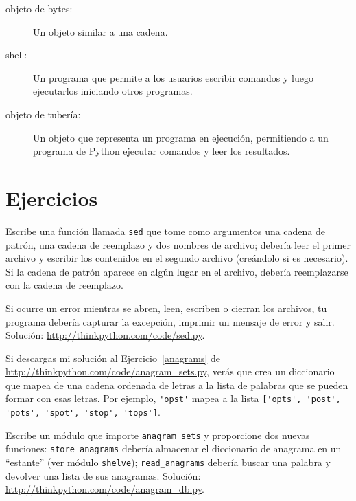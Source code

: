 \documentclass[10pt]{book}
\begin{document}
\begin{description}
\item[objeto de bytes:] Un objeto similar a una cadena.

\item[shell:] Un programa que permite a los usuarios escribir comandos y luego
ejecutarlos iniciando otros programas.

\item[objeto de tubería:] Un objeto que representa un programa en ejecución, permitiendo
a un programa de Python ejecutar comandos y leer los resultados.

\end{description}


\section{Ejercicios}

\begin{exercise}

Escribe una función llamada {\tt sed} que tome como argumentos una cadena de patrón,
una cadena de reemplazo y dos nombres de archivo; debería leer el primer archivo
y escribir los contenidos en el segundo archivo (creándolo si es
necesario).  Si la cadena de patrón aparece en algún lugar en el archivo,
debería reemplazarse con la cadena de reemplazo.

Si ocurre un error mientras se abren, leen, escriben o cierran los archivos,
tu programa debería capturar la excepción, imprimir un mensaje de error y
salir.  Solución: \url{http://thinkpython.com/code/sed.py}.

\end{exercise}


\begin{exercise}

Si descargas mi solución al Ejercicio~\ref{anagrams} de
\url{http://thinkpython.com/code/anagram_sets.py}, verás que crea
un diccionario que mapea de una cadena ordenada de letras a la lista de
palabras que se pueden formar con esas letras.  Por ejemplo,
\verb"'opst'" mapea a la lista
\verb"['opts', 'post', 'pots', 'spot', 'stop', 'tops']".

Escribe un módulo que importe \verb"anagram_sets" y proporcione
dos nuevas funciones: \verb"store_anagrams" debería almacenar el
diccionario de anagrama en un ``estante'' (ver módulo {\tt shelve}); \verb"read_anagrams" debería
buscar una palabra y devolver una lista de sus anagramas.
Solución: \url{http://thinkpython.com/code/anagram_db.py}.

\end{exercise}
\end{document}
